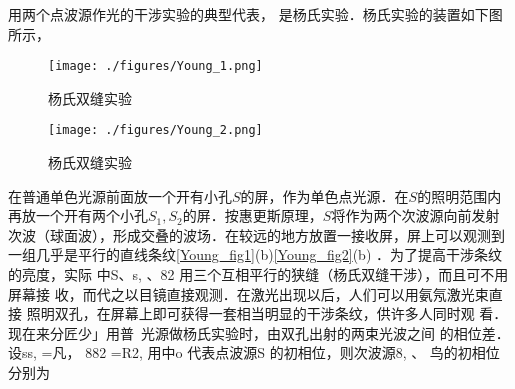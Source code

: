 
用两个点波源作光的干涉实验的典型代表， 是杨氏实验．杨氏实验的装置如下图所示，
\begin{figure}[ht]
\centering
\texttt{[image: ./figures/Young\_1.png]}
\caption{杨氏双缝实验} \label{Young_fig1}
\end{figure}
\begin{figure}[ht]
\centering
\texttt{[image: ./figures/Young\_2.png]}
\caption{杨氏双缝实验} \label{Young_fig2}
\end{figure}
在普通单色光源前面放一个开有小孔$S$的屏，作为单色点光源．在$S $的照明范围内再放一个开有两个小孔$S_1,S_2$的屏．按惠更斯原理，$S$将作为两个次波源向前发射次波（球面波），形成交叠的波场．在较远的地方放置一接收屏，屏上可以观测到一组几乎是平行的直线条纹\autoref{Young_fig1}(b)\autoref{Young_fig2}(b) ．为了提高干涉条纹的亮度，实际
中S、s, 、82 用三个互相平行的狭缝（杨氏双缝干涉），而且可不用屏幕接
收，而代之以目镜直接观测．在激光出现以后，人们可以用氨氖激光束直接
照明双孔，在屏幕上即可获得一套相当明显的干涉条纹，供许多人同时观
看．现在来分匠少」用普~光源做杨氏实验时，由双孔出射的两束光波之间
的相位差．设ss, =凡， 882 =R2, 用中o 代表点波源S 的初相位，则次波源8, 、
鸟的初相位分别为